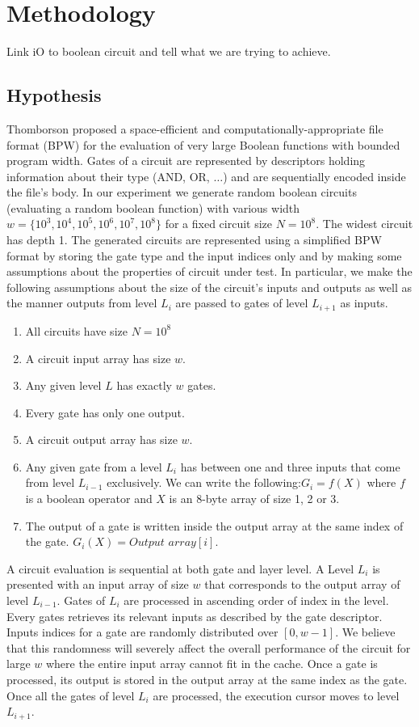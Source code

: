 \section{Methodology}
Link iO to boolean circuit and tell what we are trying to achieve.

\subsection{Hypothesis}
Thomborson proposed a space-efficient and computationally-appropriate file format (BPW) for the evaluation of very large Boolean functions with bounded program width\cite{clark}. Gates of a circuit are represented by descriptors holding information about their type (AND, OR, $\dots$) and are sequentially encoded inside the file's body. In our experiment we generate random boolean circuits (evaluating a random boolean function) with various width $w = \{ 10^3, 10^4, 10^5, 10^6, 10^7, 10^8\}$ for a fixed circuit size $N = 10^8$. The widest circuit has depth 1. The generated circuits are represented using a simplified BPW format by storing the gate type and the input indices only and by making some assumptions about the properties of circuit under test. In particular, we make the following assumptions about the size of the circuit's inputs and outputs as well as the manner outputs from level $L_i$ are passed to gates of level $L_{i+1}$ as inputs.
\begin{enumerate}  
\item All circuits have size $N = 10^8$
\item A circuit input array has size $w$.
\item Any given level $L$ has exactly $w$ gates.
\item Every gate has only one output.
\item A circuit output array has size $w$.
\item Any given gate from a level $L_i$ has between one and three inputs that come from level $L_{i-1}$ exclusively. We can write the following:\break $G_i = f(X)$ where $f$ is a boolean operator and $X$ is an 8-byte array of size 1, 2 or 3. 
\item The output of a gate is written inside the output array at the same index of the gate. $G_i(X) = Output$ $array[i]$.
\end{enumerate}
A circuit evaluation is sequential at both gate and layer level. A Level $L_i$ is presented with an input array of size $w$ that corresponds to the output array of level $L_{i-1}$. Gates of $L_i$ are processed in ascending order of index in the level. Every gates retrieves its relevant inputs as described by the gate descriptor. Inputs indices for a gate are randomly distributed over $[0, w-1]$. We believe that this randomness will severely affect the overall performance of the circuit for large $w$ where the entire input array cannot fit in the cache. Once a gate is processed, its output is stored in the output array at the same index as the gate. Once all the gates of level $L_i$ are processed, the execution cursor moves to level $L_{i+1}$.
